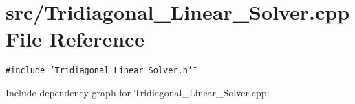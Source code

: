 \section{src/Tridiagonal\_\-Linear\_\-Solver.cpp File Reference}
\label{Tridiagonal__Linear__Solver_8cpp}
{\tt \#include \char`\"{}Tridiagonal\_\-Linear\_\-Solver.h\char`\"{}}\par


Include dependency graph for Tridiagonal\_\-Linear\_\-Solver.cpp: